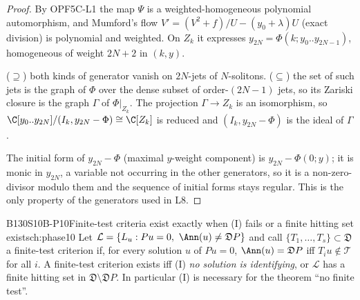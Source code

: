\begin{proof}
By OPF5C-L1 the map $\Psi$ is a weighted-homogeneous polynomial automorphism, and Mumford's flow $V'=(V^2+f)/U-(y_0+\lambda)U$ (exact division) is polynomial and weighted. On $Z_k$ it expresses $y_{2N}=\Phi(k;y_0..y_{2N-1})$, homogeneous of weight $2N+2$ in $(k,y)$.

($\supseteq$) both kinds of generator vanish on $2N$-jets of $N$-solitons. ($\subseteq$) the set of such jets is the graph of $\Phi$ over the dense subset of order-$(2N-1)$ jets, so its Zariski closure is the graph $\Gamma$ of $\Phi|_{Z_k}$. The projection $\Gamma\to Z_k$ is an isomorphism, so $\C[y_0..y_{2N}]/(I_k,y_{2N}-\Phi)\cong\C[Z_k]$ is reduced and $(I_k,y_{2N}-\Phi)$ is the ideal of $\Gamma$.

The initial form of $y_{2N}-\Phi$ (maximal $y$-weight component) is $y_{2N}-\Phi(0;y)$; it is monic in $y_{2N}$, a variable not occurring in the other generators, so it is a non-zero-divisor modulo them and the sequence of initial forms stays regular. This is the only property of the generators used in L8.

\end{proof}

\begin{dimcard}{B130}{S10B-P10}{Finite-test criteria exist exactly when (I) fails or a finite hitting set exists}{\pw}{ch:phase10}
Let $\mathcal L=\{L_u:Pu=0,\ \Ann(u)\ne\mathfrak DP\}$ and call $\{T_1,\dots,T_s\}\subset\mathfrak D$ a finite-test criterion if, for every solution $u$ of $Pu=0$, $\Ann(u)=\mathfrak DP$ iff $T_iu\notin\mathcal T$ for all $i$. A finite-test criterion exists iff (I) \emph{no solution is identifying}, or $\mathcal L$ has a finite hitting set in $\mathfrak D\setminus\mathfrak DP$. In particular (I) is necessary for the theorem ``no finite test''.
\end{dimcard}

